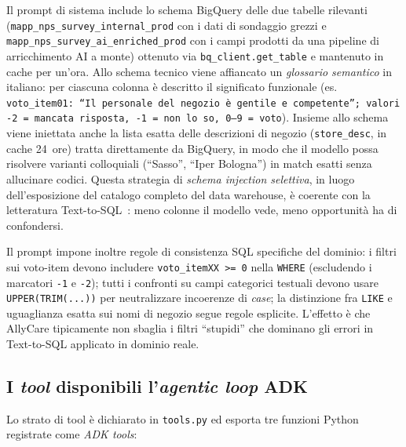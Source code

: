 Il prompt di sistema include lo schema BigQuery delle due tabelle
rilevanti (\texttt{mapp\_nps\_survey\_internal\_prod} con i dati di
sondaggio grezzi e \texttt{mapp\_nps\_survey\_ai\_enriched\_prod} con i
campi prodotti da una pipeline di arricchimento AI a monte) ottenuto via
\texttt{bq\_client.get\_table} e mantenuto in cache per un'ora. Allo
schema tecnico viene affiancato un \emph{glossario semantico} in
italiano: per ciascuna colonna è descritto il significato funzionale
(es. \texttt{voto\_item01: ``Il personale del negozio è gentile e
competente''; valori -2 = mancata risposta, -1 = non lo so, 0--9 = voto}).
Insieme allo schema viene iniettata anche la lista esatta delle
descrizioni di negozio (\texttt{store\_desc}, in cache 24~ore) tratta
direttamente da BigQuery, in modo che il modello possa risolvere
varianti colloquiali (``Sasso'', ``Iper Bologna'') in match esatti senza
allucinare codici. Questa strategia di \emph{schema injection
selettiva}, in luogo dell'esposizione del catalogo completo del data
warehouse, è coerente con la letteratura
Text-to-SQL~\cite{pourreza2023dinsql}: meno colonne il modello vede,
meno opportunità ha di confondersi.

Il prompt impone inoltre regole di consistenza SQL specifiche del
dominio: i filtri sui voto-item devono includere \texttt{voto\_itemXX
>= 0} nella \texttt{WHERE} (escludendo i marcatori \texttt{-1} e
\texttt{-2}); tutti i confronti su campi categorici testuali devono
usare \texttt{UPPER(TRIM(...))} per neutralizzare incoerenze di
\emph{case}; la distinzione fra \texttt{LIKE} e uguaglianza esatta
sui nomi di negozio segue regole esplicite. L'effetto è che AllyCare
tipicamente non sbaglia i filtri ``stupidi'' che dominano gli errori in
Text-to-SQL applicato in dominio reale.

\subsection{I \emph{tool} disponibili l'\emph{agentic loop} ADK}
\label{subsec:allycare-tools}

Lo strato di tool è dichiarato in \texttt{tools.py} ed esporta tre
funzioni Python registrate come \emph{ADK tools}:

